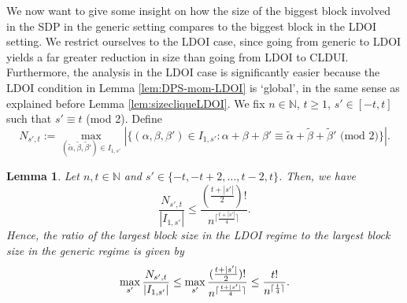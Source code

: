 \documentclass[11pt]{article}
\newcommand{\N}{\ensuremath{\mathbb{N}}}   %
\theoremstyle{plain}
\newtheorem{lemma}[satz]{Lemma}
\begin{document}
We now want to give some insight on how the size of the biggest block involved in the SDP in the generic setting compares to the biggest block in the LDOI setting. We restrict ourselves to the LDOI case, since going from generic to LDOI yields a far greater reduction in size than going from LDOI to CLDUI. Furthermore, the analysis in the LDOI case is significantly easier because the LDOI condition in 
Lemma \ref{lem:DPS-mom-LDOI} %
 is `global', in the same sense as explained before Lemma \ref{lem:sizecliqueLDOI}.
 We fix $n\in\N$, $t\ge 1$, $s'\in [-t,t]$ such that $s'\equiv t$ (mod 2).  Define 
 $$N_{s',t}:=\max_{(\tilde\alpha,\tilde\beta,\tilde\beta')\in I_{1,s'}}|\{(\alpha,\beta,\beta')\in I_{1,s'}:\alpha+\beta+\beta'\equiv\tilde\alpha+\tilde\beta+\tilde\beta'\text{ (mod 2)}\}|.$$

\begin{lemma}\label{lem:LDOIBlockRatio}
    Let $n,t\in\N$ and $s'\in\{-t,-t+2,\dots,t-2,t\}$. Then, we have
    $$\frac{N_{s',t}}{|I_{1,s'}|}\leq\frac{(\frac{t+|s'|}{2})!}{n^{\lceil\frac{t+|s'|}{4}\rceil}}.$$
   Hence,     the ratio of the largest block size   in the LDOI regime to the largest block size in the generic regime is given by 
   $$\max _{s'} \frac{N_{s',t}}{|I_{1,s'}|}\leq \max_{s'} \frac{(\frac{t+|s'|}{2})!}{n^{\lceil\frac{t+|s'|}{ {4}}\rceil}}\le {t!\over {n^{\lceil {t\over 4}\rceil}}}.$$
\end{lemma}
\end{document}
